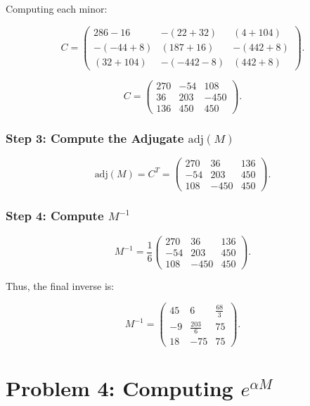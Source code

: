 \documentclass[12pt]{article}
\begin{document}
Computing each minor:

\[
C =
\begin{pmatrix}
286 - 16 & -(22 + 32) & (4 + 104) \\
-(-44 + 8) & (187 + 16) & -(442 + 8) \\
(32 + 104) & -(-442 - 8) & (442 + 8)
\end{pmatrix}.
\]

\[
C =
\begin{pmatrix}
270 & -54 & 108 \\
36 & 203 & -450 \\
136 & 450 & 450
\end{pmatrix}.
\]

\subsubsection*{Step 3: Compute the Adjugate \( \text{adj}(M) \)}

\[
\text{adj}(M) = C^T =
\begin{pmatrix}
270 & 36 & 136 \\
-54 & 203 & 450 \\
108 & -450 & 450
\end{pmatrix}.
\]

\subsubsection*{Step 4: Compute \( M^{-1} \)}

\[
M^{-1} = \frac{1}{6}
\begin{pmatrix}
270 & 36 & 136 \\
-54 & 203 & 450 \\
108 & -450 & 450
\end{pmatrix}.
\]

Thus, the final inverse is:

\[
M^{-1} =
\begin{pmatrix}
45 & 6 & \frac{68}{3} \\
-9 & \frac{203}{6} & 75 \\
18 & -75 & 75
\end{pmatrix}.
\]








\section*{Problem 4: Computing \( e^{\alpha M} \)}
\end{document}
